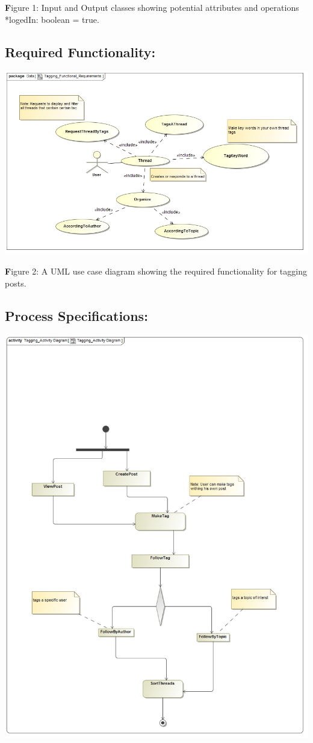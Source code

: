 \documentclass[a4paper,11pt]{article}
\begin{document}
\textbf Figure 1: Input and Output classes showing potential attributes and operations *logedIn: boolean = true.

\subsection{Required Functionality:} 
\begin{center}
\includegraphics[width=0.9\linewidth]{Tagging_Functional_Requirements}
\end{center}

\textbf Figure 2: A UML use case diagram showing the required functionality for tagging posts.

\subsection{Process Specifications:} 

\begin{center}
\includegraphics[width=0.9\linewidth]{Tagging_Activity_Diagram}
\end{center}
\end{document}
